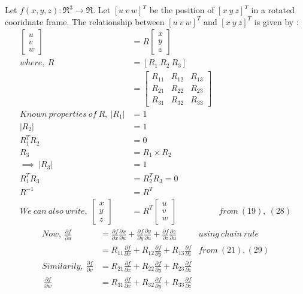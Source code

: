 \documentclass[a4paper,fleqn,11pt]{article}
\theoremstyle{mytheor}
\begin{document}
Let $f(x, y, z) : \Re^3 \rightarrow \Re$. Let $[u\ v\ w]^T$ be the position of $[x\ y\ z]^T$ in a rotated cooridnate frame.
The relationship between $[u\ v\ w]^T$ and $[x\ y\ z]^T$ is given by :
\begin{align}
\begin{bmatrix}
	u \\
	v \\
	w
\end{bmatrix} & =
	R
\begin{bmatrix}
	x \\
	y \\
	z
\end{bmatrix} \\
where,\ R & = [R_1\ R_2\ R_3] \\
& = \begin{bmatrix}
		R_{11} & R_{12} & R_{13} \\
		R_{21} & R_{22} & R_{23} \\
		R_{31} & R_{32} & R_{33}
	\end{bmatrix} \\
Known\ properties\ of\ R,\ |R_1| & = 1 \\
|R_2| & = 1 \\
R_1^T R_2 & = 0 \\
R_3  & = R_1 \times R_2 \\
\implies\ |R_3| & = 1 \\
R_1^T R_3 & = R_2^T R_3 = 0 \\
R^{-1} & = R^T \\
We\ can\ also\ write,\
\begin{bmatrix}
	x \\
	y \\
	z
\end{bmatrix} & =
	R^T
\begin{bmatrix}
	u \\
	v \\
	w
\end{bmatrix} & from\ (19),\ (28)
\end{align}
\begin{align}
Now,\ \frac{\partial f}{\partial u} & =
\frac{\partial f}{\partial x}\frac{\partial x}{\partial u} +
\frac{\partial f}{\partial y}\frac{\partial y}{\partial u} +
\frac{\partial f}{\partial z}\frac{\partial z}{\partial u} & using\ chain\ rule \\
& = R_{11}\frac{\partial f}{\partial x} +
	R_{12}\frac{\partial f}{\partial y} +
	R_{13}\frac{\partial f}{\partial z} & from\ (21), (29) \\
Similarily,\ \frac{\partial f}{\partial v}
& = R_{21}\frac{\partial f}{\partial x} +
	R_{22}\frac{\partial f}{\partial y} +
	R_{23}\frac{\partial f}{\partial z}\\
\ \frac{\partial f}{\partial w}
& = R_{31}\frac{\partial f}{\partial x} +
	R_{32}\frac{\partial f}{\partial y} +
	R_{33}\frac{\partial f}{\partial z}
\end{align}
\end{document}
